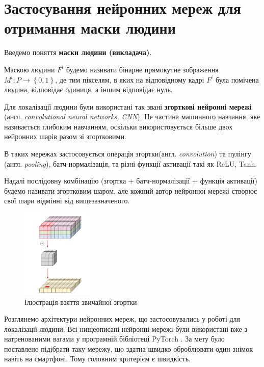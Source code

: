\section{Застосування нейронних мереж для отримання маски людини}

Введемо поняття \textbf{маски людини (викладача)}.

Маскою людини \(F^{i}\) будемо називати бінарне прямокутне
зображення \(M^{i}:P \rightarrow \left\{ 0,1 \right\}\), де тим
пікселям, в яких на відповідному кадрі \(F^{i}\) була помічена людина,
відповідає одиниця, а іншим відповідає нуль.


Для локалізації людини були використані так звані \textbf{згорткові нейронні мережі}
(англ. \textit{convolutional neural networks, CNN}).
Це частина машинного навчання, яке називається глибоким навчанням, оскільки використовується
більше двох нейронних шарів разом зі згортковими.

В таких мережах застосовується операція згортки(англ. \textit{convolution})
та пулінгу (англ. \textit{pooling}), батч-нормалізація, та різні функції
активації такі як ReLU, Tanh.

Надалі послідовну комбінацію (згортка + батч-нормалізації + функція активації)
будемо називати згортковим шаром, але кожний автор нейронної мережі
створює свої шари відмінні від вищезазначеного.

\begin{figure}[H]
    \centering
    \includegraphics[width=0.3\textwidth]{images/cnn_conv_operation}
    \caption{Ілюстрація взяття звичайної згортки  \cite{deep_wise_sep_conv_website}
        \label{fig:cnn:deep_wise_conv}
    }
\end{figure}

Розглянемо архітектури нейронних мереж, що застосовувались у роботі
для локалізації людини. Всі нищеописані нейронні мережі були використані вже з
натренованими вагами у програмній бібліотеці PyTorch \cite{NEURIPS2019_9015}.
За мету було поставлено підібрати таку мережу, що здатна швидко оброблювати
один знімок навіть на смартфоні. Тому головним критерієм є швидкість.

